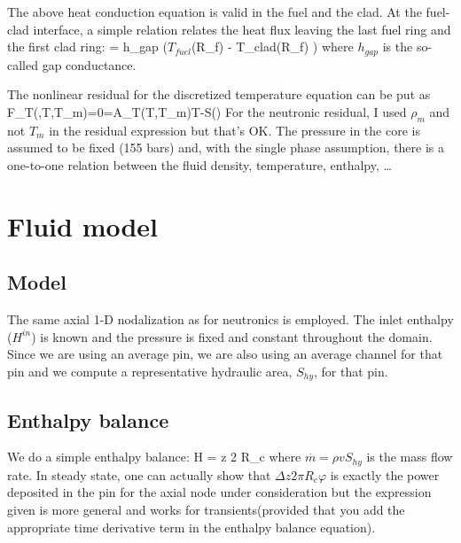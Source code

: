 \documentclass[11pt]{article}
\newcommand{\Tf}{\ensuremath{T_{\textit{fuel}}}\xspace}
\newcommand{\ro}{\ensuremath{\rho_{\textit{m}}}\xspace}
\begin{document}
The above heat conduction equation is valid in the fuel and the clad. At the fuel-clad interface, a simple relation relates the heat flux leaving the last fuel ring and the first clad ring:
\be
\varphi = h_{gap} \Big (\Tf(R_f) - T_{clad}(R_f) \Big)
\ee
where $h_{gap}$ is the so-called gap conductance.

\bigskip

The nonlinear residual for the discretized temperature equation can be put as
\be
F_T(\phi,T,T_m)=0=A_T(T,T_m)T-S(\phi)
\ee
For the neutronic residual, I used $\ro$ and not $T_m$ in the residual expression 
but that's OK. The pressure in the core is assumed to be fixed (155 bars) and, with the single phase assumption, there is a one-to-one relation between the fluid density, temperature, enthalpy, \ldots



\section{Fluid model}

\subsection{Model}

The same axial 1-D nodalization as for neutronics is employed. The inlet enthalpy ($H^{in}$) is known and the pressure is fixed and constant throughout the domain. Since we are using an average pin, we are also using an average channel for that pin and we compute a representative hydraulic area, $S_{hy}$, for that pin.

\subsection{Enthalpy balance}
We do a simple enthalpy balance:
\be
{} \Delta H = \Delta z 2 \pi R_c \varphi
\ee
where $\overset{\cdot}{m}=\rho v S_{hy}$ is the mass flow rate. In steady state, one can actually show that 
$\Delta z 2\pi R_c \varphi$ is exactly the power deposited in the pin for the axial node under consideration but the expression given is more general and works for transients(provided that you add the appropriate time derivative term in the enthalpy balance equation).
\end{document}
